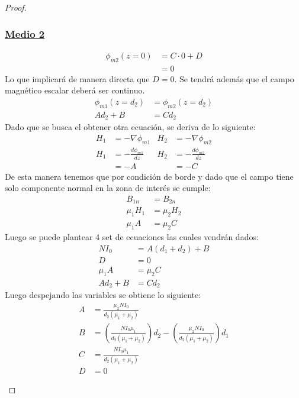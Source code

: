 \begin{proof}
\begin{enumerate}
    \subsubsection*{\underline{Medio 2}}
    \begin{align}
        \phi_{m2}(z=0)  &= C\cdot 0+ D \\&= 0
    \end{align}
    Lo que implicará de manera directa que $D=0$. Se tendrá además que el campo magnético escalar deberá ser continuo.
    \begin{align}
        \phi_{m1}(z=d_{2}) &=\phi_{m2}(z=d_{2}) \\ A d_{2} + B &= C d_{2} 
    \end{align}
    Dado que se busca el obtener otra ecuación, se deriva de lo siguiente:
    \begin{align}
        H_{1} &= - \nabla \phi_{m1} &  
        H_{2} &= - \nabla \phi_{m2}\\
         H_{1}&= -\frac{d\phi_{m1}}{dz} &   H_{2}&= -\frac{d\phi_{m2}}{dz}\\
         &= -A  &  &= -C
    \end{align}
    De esta manera tenemos que por condición de borde y dado que el campo tiene solo componente normal en la zona de interés se cumple:
    \begin{align}
        B_{1n} &= B_{2n}\\
        \mu_{1}H_{1} &=  \mu_{2}H_{2}\\
        \mu_{1}A &=  \mu_{2}C   
    \end{align}
    Luego se puede plantear 4 set de ecuaciones las cuales vendrán dados:
    \begin{align}
        NI_{0} &= A(d_{1} + d_{2}) + B\\
        D&=0\\
        \mu_{1}A &=  \mu_{2}C\\
        Ad_{2} + B &= Cd_{2}
    \end{align}
    Luego despejando las variables se obtiene lo siguiente:
    \begin{align}
    A &= \frac{\mu_{2} N I_{0}}{d_{2}(\mu_{1} + \mu_{2})}\\
     B&= \left(\frac{NI_{0}\mu_{1}}{d_{2}(\mu_{1} + \mu_{2})}\right) d_{2} - \left(\frac{\mu_{2} N I_{0}}{d_{2}(\mu_{1} + \mu_{2})}\right)d_{1}\\
     C&= \frac{NI_{0}\mu_{1}}{d_{2}(\mu_{1} + \mu_{2})}\\
     D&=0
    \end{align}

\end{enumerate}
\end{proof}

